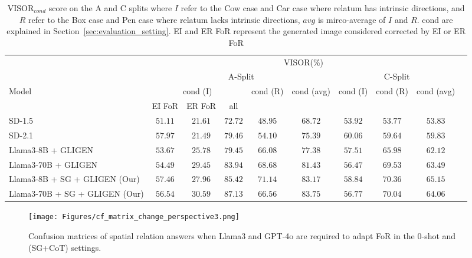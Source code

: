\begin{table*}[ht!]
    \centering
    \setlength{\tabcolsep}{1mm}
    \small
    \begin{tabular}{|l | c c c | c | c | c | c | c | c |}
    \hline
         & \multicolumn{8}{c|}{VISOR(\%)} \\ \cline{2-9}
          & \multicolumn{5}{|c|}{ A-Split } &  \multicolumn{3}{|c|}{ C-Split }\\ \hline
        Model & \multicolumn{3}{|c|}{cond (I)} & cond (R) & cond (avg) & cond (I) & cond (R) & cond (avg) \\ \cline{2-4}
        & EI FoR & ER FoR & all & & & & & \\ \hline
        SD-1.5   & $ 51.11$  & $ 21.61$  &  $ 72.72$ & $ 48.95$ & $ 68.72$ & $ 53.92$ & $ 53.77$ & $ 53.83$ \\
        SD-2.1  & $ 57.97$  & $ 21.49$ &  $ 79.46$ & $ 54.10$ & $ 75.39$ & $\mathbf{60.06}$ & $ 59.64$ & $ 59.83$ \\
        \hline
        Llama3-8B + GLIGEN& $ 53.67$  & $ 25.78$ & $ 79.45$ & $ 66.08$ & $ 77.38$ & $ 57.51$ & $ 65.98$ & $ 62.12$ \\
        Llama3-70B + GLIGEN & $ 54.49$  & $ 29.45$ & $ 83.94$ & $ 68.68$ & $ 81.43$ & $ 56.47$ & $ 69.53$ & $ 63.49$ \\
        Llama3-8B + SG + GLIGEN (Our) & $ 57.46$  & $ 27.96$ & $ 85.42$ & $\mathbf{71.14}$ & $ 83.17$ & $ 58.84$ & $\mathbf{70.36}$ & $ \mathbf{65.15}$ \\
        Llama3-70B + SG + GLIGEN (Our)  & $ 56.54$  & $ 30.59$ & $ \mathbf{87.13}$ & $ 66.56$ & $\mathbf{83.75}$ & $ 56.77$ & ${70.04}$ & ${64.06}$ \\
        \hline
    \end{tabular}
    \caption{VISOR$_{cond}$ score on the A and C splits where $I$ refer to the Cow case and Car case where relatum has intrinsic directions, and $R$ refer to the Box case and Pen case where relatum lacks intrinsic directions, $avg$ is mirco-average of $I$ and $R$. cond are explained in Section~\ref{sec:evaluation_setting}. EI and ER FoR represent the generated image considered corrected by EI or ER FoR }
    \label{tab:I_split}
\end{table*}

\begin{figure}[t]
    \centering
    \texttt{[image: Figures/cf\_matrix\_change\_perspective3.png]}
    \caption{Confusion matrices of spatial relation answers when Llama3 and GPT-4o are required to adapt FoR in the 0-shot and (SG+CoT) settings.}
    \label{fig:cf_conversion}
\end{figure}

